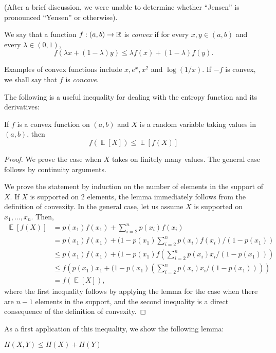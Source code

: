 \documentclass[10pt]{article}
\newcommand{\Expect}[1]{\mathop{\mathbb{E}}\left
[ #1 \right ]}
\begin{document}
(After a brief discussion, we were unable to determine whether ``Jensen'' is pronounced ``Yensen'' or otherwise).

\begin{definition} We say that a function $f:(a,b) \rightarrow {\mathbb R}$ is \emph{convex} if for every $x,y \in (a,b)$ and every $\lambda \in (0,1)$, \[f(\lambda x + (1-\lambda) y) \leq \lambda f(x) + (1-\lambda) f(y). \]
\end{definition}

Examples of convex functions include $x, e^x, x^2$ and $\log(1/x)$. If $-f$ is convex, we shall say that $f$ is \emph{concave}.

The following is a useful inequality for dealing with the entropy function and its derivatives:

\begin{lemma}  If $f$ is a convex function on $(a,b)$ and $X$ is a random variable taking values in $(a,b)$, then \[f(\Expect{X}) \leq \Expect{f(X)}\]
\end{lemma}
\begin{proof}
	We prove the case when $X$ takes on finitely many values. The general case follows by continuity arguments.
	
	We prove the statement by induction on the number of elements in the support of $X$. If $X$ is supported on $2$ elements, the lemma immediately follows from the definition of convexity. In the general case, let us assume $X$ is supported on $x_1,\dotsc,x_n$. Then,
	\begin{align*}
		\Expect{f(X)} &= p(x_1) f(x_1) + \sum_{i=2}^{n} p(x_i) f(x_i) \\
		&= p(x_1) f(x_1) + (1-p(x_1)\sum_{i=2}^{n} p(x_i) f(x_i) / (1-p(x_1))\\
		&\leq p(x_1) f(x_1) + (1-p(x_1) f\left(\sum_{i=2}^{n} p(x_i) x_i / (1-p(x_1)) \right)\\
		&\leq f\left(p(x_1) x_1 + (1-p(x_1) \left(\sum_{i=2}^{n} p(x_i) x_i / (1-p(x_1)) \right)  \right)\\
		&= f(\Expect{X}),
	\end{align*}
	where the first inequality follows by applying the lemma for the case when there are $n-1$ elements in the support, and the second inequality is a direct consequence of the definition of convexity.
\end{proof}

As a first application of this inequality, we show the following lemma:

\begin{lemma}  $H(X,Y) \leq H(X) + H(Y)$
\end{lemma}
\end{document}
